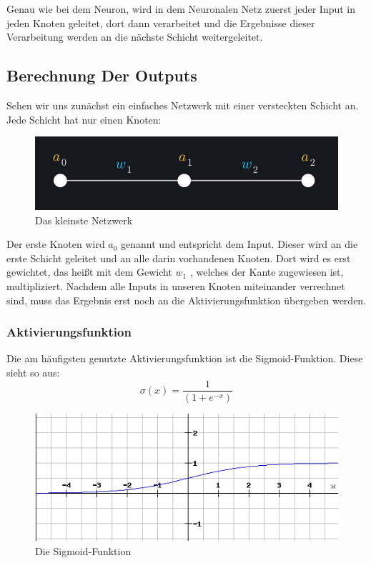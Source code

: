 \documentclass[12pt]{article}
\begin{document}
  Genau wie bei dem Neuron, wird in dem Neuronalen Netz zuerst jeder Input in jeden Knoten geleitet, dort dann verarbeitet und die Ergebnisse dieser Verarbeitung werden an die nächste Schicht weitergeleitet.\subsection{Berechnung Der Outputs}Sehen wir uns zunächst ein einfaches Netzwerk mit einer versteckten Schicht an. Jede Schicht hat nur einen Knoten:
\begin{figure}[H]
\centering
\includegraphics[scale=0.5]{./Images/Pasted image 20230912184748.png}
\caption{Das kleinste Netzwerk}
\label{Das kleinste Netzwerk}
\end{figure}Der erste Knoten wird $a_0$ genannt und entspricht dem Input. Dieser wird an die erste Schicht geleitet und an alle darin vorhandenen Knoten. Dort wird es erst gewichtet, das heißt mit dem Gewicht $w_1$ , welches der Kante zugewiesen ist, multipliziert. Nachdem alle Inputs in unseren Knoten miteinander verrechnet sind, muss das Ergebnis erst noch an die Aktivierungsfunktion übergeben werden.\subsubsection{Aktivierungsfunktion}Die am häufigsten genutzte Aktivierungsfunktion ist die Sigmoid-Funktion. Diese sieht so aus:
$$\sigma (x)=\frac{1}{(1+e^{-x})}$$
\begin{figure}[H]
\centering
\includegraphics[scale=0.70]{./Images/Pasted image 20230912192401.png}
\caption{Die Sigmoid-Funktion}
\label{Die Sigmoid-Funktion}
\end{figure}
\end{document}
